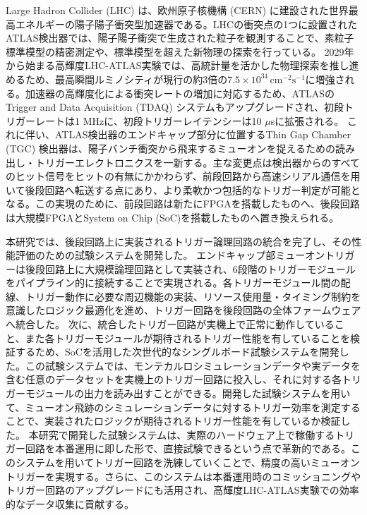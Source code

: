 Large Hadron Collider (LHC) は、欧州原子核機構 (CERN) に建設された世界最高エネルギーの陽子陽子衝突型加速器である。LHCの衝突点の1つに設置されたATLAS検出器では、陽子陽子衝突で生成された粒子を観測することで、素粒子標準模型の精密測定や、標準模型を超えた新物理の探索を行っている。
2029年から始まる高輝度LHC-ATLAS実験では、高統計量を活かした物理探索を推し進めるため、最高瞬間ルミノシティが現行の約3倍の$7.5 \times 10^{34}\, \mathrm{cm^{-2}s^{-1}}$に増強される。加速器の高輝度化による衝突レートの増加に対応するため、ATLASのTrigger and Data Acquisition (TDAQ) システムもアップグレードされ、初段トリガーレートは1 MHzに、初段トリガーレイテンシーは10 $\mu$sに拡張される。
これに伴い、ATLAS検出器のエンドキャップ部分に位置するThin Gap Chamber (TGC) 検出器は、陽子バンチ衝突から飛来するミューオンを捉えるための読み出し・トリガーエレクトロニクスを一新する。主な変更点は検出器からのすべてのヒット信号をヒットの有無にかかわらず、前段回路から高速シリアル通信を用いて後段回路へ転送する点にあり、より柔軟かつ包括的なトリガー判定が可能となる。この実現のために、前段回路は新たにFPGAを搭載したものへ、後段回路は大規模FPGAとSystem on Chip (SoC)を搭載したものへ置き換えられる。

本研究では、後段回路上に実装されるトリガー論理回路の統合を完了し、その性能評価のための試験システムを開発した。
エンドキャップ部ミューオントリガーは後段回路上に大規模論理回路として実装され、6段階のトリガーモジュールをパイプライン的に接続することで実現される。各トリガーモジュール間の配線、トリガー動作に必要な周辺機能の実装、リソース使用量・タイミング制約を意識したロジック最適化を進め、トリガー回路を後段回路の全体ファームウェアへ統合した。
次に、統合したトリガー回路が実機上で正常に動作していること、また各トリガーモジュールが期待されるトリガー性能を有していることを検証するため、SoCを活用した次世代的なシングルボード試験システムを開発した。この試験システムでは、モンテカルロシミュレーションデータや実データを含む任意のデータセットを実機上のトリガー回路に投入し、それに対する各トリガーモジュールの出力を読み出すことができる。開発した試験システムを用いて、ミューオン飛跡のシミュレーションデータに対するトリガー効率を測定することで、実装されたロジックが期待されるトリガー性能を有しているか検証した。
本研究で開発した試験システムは、実際のハードウェア上で稼働するトリガー回路を本番運用に即した形で、直接試験できるという点で革新的である。このシステムを用いてトリガー回路を洗練していくことで、精度の高いミューオントリガーを実現する。さらに、このシステムは本番運用時のコミッショニングやトリガー回路のアップグレードにも活用され、高輝度LHC-ATLAS実験での効率的なデータ収集に貢献する。

